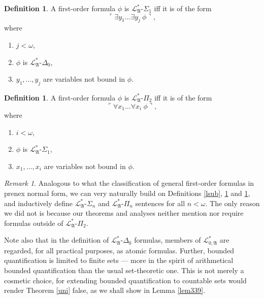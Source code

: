 \documentclass[12pt, twoside]{memoir}
\numberwithin{equation}{section}
\theoremstyle{definition}
\newtheorem{defi}[thm]{Definition}
\theoremstyle{remark}
\newtheorem{rem}[thm]{Remark}
\theoremstyle{definition}
\theoremstyle{definition}
\theoremstyle{definition}
\theoremstyle{remark}
\begin{document}
\begin{defi}\label{LSigma1}
A first-order formula $\phi$ is $\mathcal{L}^{*}_{\mathfrak{A}}$-$\Sigma_1$ iff it is of the form $$\ulcorner \exists y_1 \dots \exists y_j \ \phi \urcorner,$$
where 
\begin{enumerate}[label=(\alph*)]
    \item $j < \omega$,
    \item $\phi$ is $\mathcal{L}^{*}_{\mathfrak{A}}$-$\Delta_0$,
    \item $y_1, \dots, y_j$ are variables not bound in $\phi$.
\end{enumerate}
\end{defi}

\begin{defi}\label{LPi2}
A first-order formula $\phi$ is $\mathcal{L}^{*}_{\mathfrak{A}}$-$\Pi_2$ iff it is of the form $$\ulcorner \forall x_1 \dots \forall x_i \ \phi \urcorner,$$
where 
\begin{enumerate}[label=(\alph*)]
    \item $i < \omega$,
    \item $\phi$ is $\mathcal{L}^{*}_{\mathfrak{A}}$-$\Sigma_1$,
    \item $x_1, \dots, x_i$ are variables not bound in $\phi$.
\end{enumerate}
\end{defi}

\begin{rem}\label{snpn}
Analogous to what the classification of general first-order formulas in prenex normal form, we can very naturally build on Definitions \ref{lsub}, \ref{LSigma1} and \ref{LPi2}, and inductively define $\mathcal{L}^{*}_{\mathfrak{A}}$-$\Sigma_n$ and $\mathcal{L}^{*}_{\mathfrak{A}}$-$\Pi_n$ sentences for all $n < \omega$. The only reason we did not is because our theorems and analyses neither mention nor require formulas outside of $\mathcal{L}^{*}_{\mathfrak{A}}$-$\Pi_2$.  
\end{rem}

Note also that in the definition of $\mathcal{L}^{*}_{\mathfrak{A}}$-$\Delta_0$ formulas, members of $\mathcal{L}^{*}_{0, \mathfrak{A}}$ are regarded, for all practical purposes, as atomic formulas. Further, bounded quantification is limited to finite sets --- more in the spirit of arithmetical bounded quantification than the usual set-theoretic one. This is not merely a cosmetic choice, for extending bounded quantification to countable sets would render Theorem \ref{uni} false, as we shall show in Lemma \ref{lem339}.
\end{document}

